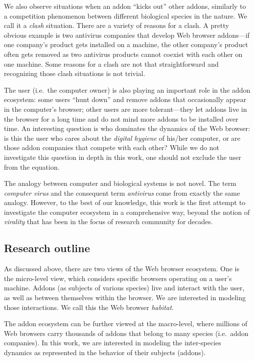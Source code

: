 \documentclass[ijoc,nonblindrev]{informs3} %
\numberwithin{equation}{subsection}
\begin{document}
We also observe situations when an addon ``kicks out'' other addons, similarly to a competition phenomenon between different biological species in the nature. We call it a \emph{clash} situation. There are a variety of reasons for a clash. A pretty obvious example is two antivirus companies that develop Web browser addons---if one company's product gets installed on a machine, the other company's product often gets removed as two antivirus products cannot coexist with each other on one machine. Some reasons for a clash are not that straightforward and recognizing those clash situations is not trivial.

The user (i.e.~the computer owner) is also playing an important role in the addon ecosystem: some users ``hunt down'' and remove addons that occasionally appear in the computer's browser; other users are more tolerant---they let addons live in the browser for a long time and do not mind more addons to be installed over time. An interesting question is who dominates the dynamics of the Web browser: is this the user who cares about the \emph{digital hygiene} of his/her computer, or are those addon companies that compete with each other? While we do not investigate this question in depth in this work, one should not exclude the user from the equation.

The analogy between computer and biological systems is not novel. The term \emph{computer virus} and the consequent term \emph{antivirus} come from exactly the same analogy. However, to the best of our knowledge, this work is the first attempt to investigate the computer ecosystem in a comprehensive way, beyond the notion of \emph{virality} that has been in the focus of research community for decades.

\subsection{Research outline}

As discussed above, there are two views of the Web browser ecosystem. One is the micro-level view, which considers specific browsers operating on a user's machine. Addons (as subjects of various species) live and interact with the user, as well as between themselves within the browser. We are interested in modeling those interactions. We call this the Web browser \emph{habitat}. 

The addon ecosystem can be further viewed at the macro-level, where millions of Web browsers carry thousands of addons that belong to many species (i.e.~addon companies). In this work, we are interested in modeling the inter-species dynamics as represented in the behavior of their subjects (addons).
\end{document}
